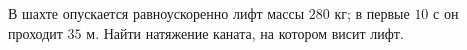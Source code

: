 В шахте опускается равноускоренно лифт массы $280$ кг; в первые $10$ с
он проходит $35$ м. Найти натяжение каната, на котором висит лифт.
